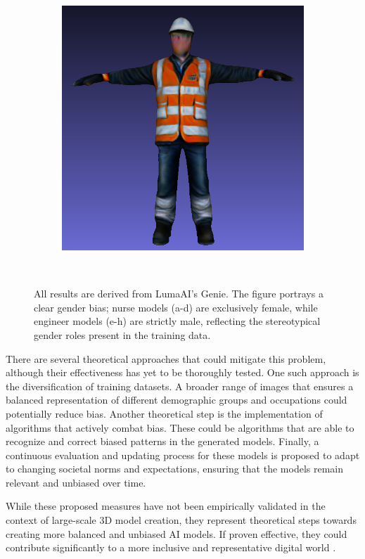 \begin{figure}[H]
\begin{subfigure}[b]{0.324\textwidth}
        \includegraphics[width=\textwidth]{etc/bias/bias_engineer_genie_4.png}
        \caption{}
    \end{subfigure}
    \caption{All results are derived from LumaAI's Genie. The figure portrays a clear gender bias; nurse models (a-d) are exclusively female, while engineer models (e-h) are strictly male, reflecting the stereotypical gender roles present in the training data.}~\label{fig:biasNurseEngineer}
\end{figure}

There are several theoretical approaches that could mitigate this problem, although their effectiveness has yet to be thoroughly tested. One such approach is the diversification of training datasets. A broader range of images that ensures a balanced representation of different demographic groups and occupations could potentially reduce bias. Another theoretical step is the implementation of algorithms that actively combat bias. These could be algorithms that are able to recognize and correct biased patterns in the generated models.  Finally, a continuous evaluation and updating process for these models is proposed to adapt to changing societal norms and expectations, ensuring that the models remain relevant and unbiased over time.

While these proposed measures have not been empirically validated in the context of large-scale 3D model creation, they represent theoretical steps towards creating more balanced and unbiased AI models. If proven effective, they could contribute significantly to a more inclusive and representative digital world \citep{luccioni2023stable}.
